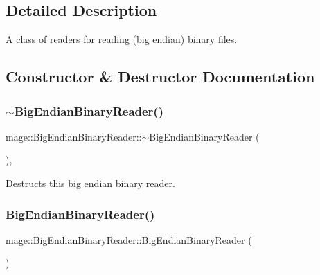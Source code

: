 \subsection{Detailed Description}
A class of readers for reading (big endian) binary files. 

\subsection{Constructor \& Destructor Documentation}
\hypertarget{classmage_1_1_big_endian_binary_reader_ae85a40e8ed06e8c887e38d914843b8d3}{}\label{classmage_1_1_big_endian_binary_reader_ae85a40e8ed06e8c887e38d914843b8d3} 
\subsubsection{\texorpdfstring{$\sim$\+Big\+Endian\+Binary\+Reader()}{~BigEndianBinaryReader()}}
{\footnotesize\ttfamily mage\+::\+Big\+Endian\+Binary\+Reader\+::$\sim$\+Big\+Endian\+Binary\+Reader (\begin{DoxyParamCaption}{ }\end{DoxyParamCaption})\hspace{0.3cm}{\ttfamily [virtual]}, {\ttfamily [default]}}

Destructs this big endian binary reader. \hypertarget{classmage_1_1_big_endian_binary_reader_a1fd0dbee6950a8cb04aa399f0cdbaf2a}{}\label{classmage_1_1_big_endian_binary_reader_a1fd0dbee6950a8cb04aa399f0cdbaf2a} 
\subsubsection{\texorpdfstring{Big\+Endian\+Binary\+Reader()}{BigEndianBinaryReader()}\hspace{0.1cm}{\footnotesize\ttfamily [1/3]}}
{\footnotesize\ttfamily mage\+::\+Big\+Endian\+Binary\+Reader\+::\+Big\+Endian\+Binary\+Reader (\begin{DoxyParamCaption}{ }\end{DoxyParamCaption})\hspace{0.3cm}{\ttfamily [protected]}}

